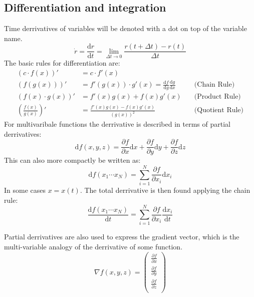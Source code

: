 \documentclass[11pt, a4paper]{article}
\renewcommand*{\d}{\text{d}}
\begin{document}
\subsection{Differentiation and integration}
Time derrivatives of variables will be denoted with a dot on top of the variable name.
\begin{equation*}
  \dot{r} = \frac{\d r}{\d t} = \lim_{\Delta t \to 0} \frac{r(t + \Delta t) - r(t)}{\Delta t}
\end{equation*}
The basic rules for differentiation are:
\begin{align*}
  (c \cdot f(x))' &= c \cdot f'(x) &\\
  (f(g(x)))' &= f'(g(x)) \cdot g'(x) = \frac{\d f}{\d g} \frac{\d g}{\d x} \quad &\text{(Chain Rule)}\\ 
  (f(x) \cdot g(x))' &= f'(x)g(x) + f(x)g'(x) \quad &\text{(Product Rule)}\\
  \left( \frac{f(x)}{g(x)} \right)' &= \frac{f'(x)g(x) - f(x)g'(x)}{(g(x))^2} \quad &\text{(Quotient Rule)}
\end{align*}
For multivaribale functions the derrivative is described in terms of partial derrivatives:
\begin{equation*}
  \d f(x, y, z) = \frac{\partial f}{\partial x}\d x + \frac{\partial f}{\partial y}\d y + \frac{\partial f}{\partial z}\d z
\end{equation*}
This can also more compactly be written as:
\begin{equation*}
  \d f(x_1 \cdots x_N) = \sum_{i=1}^{N} \frac{\partial f}{\partial x_i}\d x_i
\end{equation*}
In some cases $x = x(t)$. The total derrivative is then found applying the chain rule:
\begin{equation*}
  \frac{\d f(x_1 \cdots x_N)}{\d t} = \sum_{i=1}^{N} \frac{\partial f}{\partial x_i} \frac{\d x_i}{\d t}
\end{equation*}

Partial derrivatives are also used to express the gradient vector, which is the multi-variable analogy of the derrivative of some function.
\begin{equation*}
  \nabla f(x, y, z) =
  \begin{pmatrix}
    \frac{\partial f}{\partial x}\\
    \frac{\partial f}{\partial y}\\
    \frac{\partial f}{\partial z}\\
  \end{pmatrix}
\end{equation*}
\end{document}
